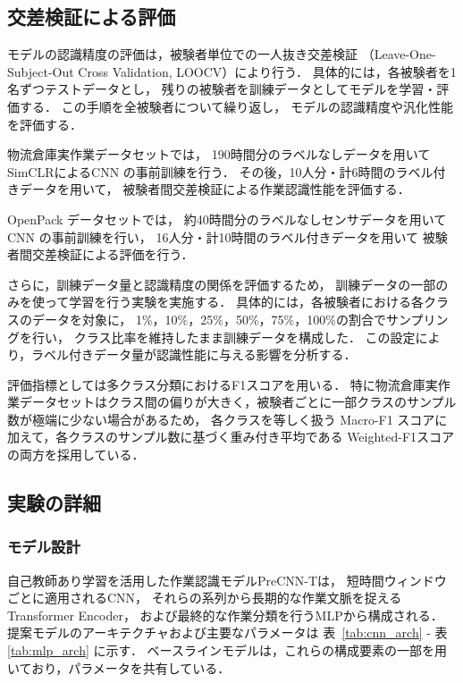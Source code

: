 \documentclass[submit]{ipsj}
\newcommand{\rev}[1]{{\color{red}#1}}
\begin{document}
{\subsection{交差検証による評価}
モデルの認識精度の評価は，被験者単位での一人抜き交差検証
（Leave-One-Subject-Out Cross Validation, LOOCV）により行う．
具体的には，各被験者を1名ずつテストデータとし，
残りの被験者を訓練データとしてモデルを学習・評価する．
この手順を全被験者について繰り返し，
モデルの認識精度や汎化性能を評価する．

物流倉庫実作業データセットでは，
190時間分のラベルなしデータを用いてSimCLRによるCNN の事前訓練を行う．
その後，10人分・計6時間のラベル付きデータを用いて，
被験者間交差検証による作業認識性能を評価する．

OpenPack データセットでは，
約40時間分のラベルなしセンサデータを用いて
CNN の事前訓練を行い，
16人分・計10時間のラベル付きデータを用いて
被験者間交差検証による評価を行う．

\rev{さらに，訓練データ量と認識精度の関係を評価するため，
訓練データの一部のみを使って学習を行う実験を実施する．
具体的には，各被験者における各クラスのデータを対象に，
1\%，10\%，25\%，50\%，75\%，100\%の割合でサンプリングを行い，
クラス比率を維持したまま訓練データを構成した．
この設定により，ラベル付きデータ量が認識性能に与える影響を分析する．}

評価指標としては多クラス分類におけるF1スコアを用いる．
特に物流倉庫実作業データセットはクラス間の偏りが\rev{大きく，被験者ごとに一部クラスのサンプル数が極端に少ない場合があるため，}
各クラスを等しく扱う Macro-F1 スコアに加えて，各クラスのサンプル数に基づく重み付き平均である
Weighted-F1スコアの両方を採用している．



\subsection{実験の詳細}
\subsubsection{モデル設計}
自己教師あり学習を活用した作業認識モデルPreCNN-Tは，
短時間ウィンドウごとに適用されるCNN，
それらの系列から長期的な作業文脈を捉えるTransformer Encoder，
および最終的な作業分類を行うMLPから構成される．
提案モデルのアーキテクチャおよび主要なパラメータは
\rev{表}~\ref{tab:cnn_arch} - \rev{表}\ref{tab:mlp_arch} に示す．
ベースラインモデルは，これらの構成要素の一部を用いており，パラメータを共有している．




}
\end{document}
